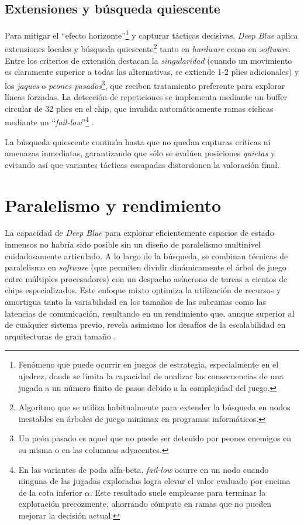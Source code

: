 \documentclass[a4paper, 12pt]{article}
\begin{document}
\subsection{Extensiones y búsqueda quiescente}

Para mitigar el “efecto horizonte”\footnote{Fenómeno que puede ocurrir 
en juegos de estrategia, especialmente en el ajedrez, donde se 
limita la capacidad de analizar las consecuencias de una jugada 
a un número finito de pasos debido a la complejidad del juego.} 
y capturar tácticas 
decisivas, \textit{Deep Blue} aplica extensiones locales y 
búsqueda quiescente\footnote{Algoritmo que se utiliza 
habitualmente para extender la búsqueda en nodos inestables en 
árboles de juego minimax en programas informáticos.} 
tanto en \emph{hardware} como en \emph{software}. 
Entre los criterios de extensión destacan la \emph{singularidad} 
(cuando un movimiento es claramente superior a todas las alternativas, 
se extiende 1-2 plies adicionales) y los \emph{jaques} o 
\emph{peones pasados}\footnote{Un peón pasado es aquel que no puede ser detenido por peones enemigos en su misma o en las columnas adyacentes.}, 
que reciben tratamiento 
preferente para explorar líneas forzadas. 
La detección de repeticiones se implementa mediante un buffer 
circular de 32 plies en el chip, que invalida automáticamente 
ramas cíclicas mediante un “\emph{fail-low}”\footnote{En 
las variantes de poda alfa-beta, \emph{fail-low} 
ocurre en un nodo cuando ninguna de las jugadas exploradas 
logra elevar el valor evaluado por encima de la cota inferior 
\(\alpha\). Este resultado suele emplearse 
para terminar la exploración precozmente, ahorrando cómputo en 
ramas que no pueden mejorar la decisión actual.} 
\cite{campbell1999search}.  

La búsqueda quiescente continúa hasta que no quedan capturas 
críticas ni amenazas inmediatas, garantizando que sólo se 
evalúen posiciones \emph{quietas} y evitando así que variantes 
tácticas escapadas distorsionen la valoración final.














\section{Paralelismo y rendimiento}

La capacidad de \textit{Deep Blue} para explorar eficientemente 
espacios de estado inmensos no habría sido posible sin un diseño 
de paralelismo multinivel cuidadosamente articulado. A lo largo 
de la búsqueda, se combinan técnicas de paralelismo en \emph{software} 
(que permiten dividir dinámicamente el árbol de juego entre 
múltiples procesadores) con un despacho asíncrono de tareas a 
cientos de chips especializados. Este enfoque mixto optimiza la 
utilización de recursos y amortigua tanto la variabilidad en los 
tamaños de las subramas como las latencias de comunicación, 
resultando en un rendimiento que, aunque superior al de cualquier 
sistema previo, revela asimismo los desafíos de la escalabilidad 
en arquitecturas de gran tamaño \cite{campbell2002deep}. 
\end{document}
